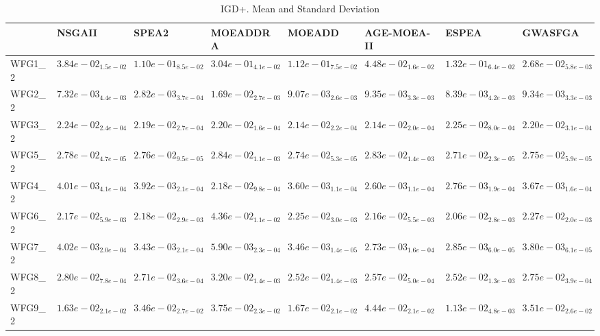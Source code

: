 \documentclass{article}
\begin{document}
\begin{table}
\caption{IGD+. Mean and Standard Deviation}
\label{table: IGD+}
\centering
\begin{scriptsize}
\begin{tabular}{llllllll}
\hline & NSGAII & SPEA2 & MOEADDRA & MOEADD & AGE-MOEA-II & ESPEA &  GWASFGA\\
\hline 
WFG1\_2 & \cellcolor{gray25}$  3.84e-02_{ 1.5e-02}$ & $  1.10e-01_{ 8.5e-02}$ & $  3.04e-01_{ 4.1e-02}$ & $  1.12e-01_{ 7.5e-02}$ & $  4.48e-02_{ 1.6e-02}$ & $  1.32e-01_{ 6.4e-02}$ & \cellcolor{gray95}$  2.68e-02_{ 5.8e-03}$ \\
WFG2\_2 & \cellcolor{gray25}$  7.32e-03_{ 4.4e-03}$ & \cellcolor{gray95}$  2.82e-03_{ 3.7e-04}$ & $  1.69e-02_{ 2.7e-03}$ & $  9.07e-03_{ 2.6e-03}$ & $  9.35e-03_{ 3.3e-03}$ & $  8.39e-03_{ 4.2e-03}$ & $  9.34e-03_{ 3.3e-03}$ \\
WFG3\_2 & $  2.24e-02_{ 2.4e-04}$ & $  2.19e-02_{ 2.7e-04}$ & $  2.20e-02_{ 1.6e-04}$ & \cellcolor{gray25}$  2.14e-02_{ 2.2e-04}$ & \cellcolor{gray95}$  2.14e-02_{ 2.0e-04}$ & $  2.25e-02_{ 8.0e-04}$ & $  2.20e-02_{ 3.1e-04}$ \\
WFG5\_2 & $  2.78e-02_{ 4.7e-05}$ & $  2.76e-02_{ 9.5e-05}$ & $  2.84e-02_{ 1.1e-03}$ & \cellcolor{gray25}$  2.74e-02_{ 5.3e-05}$ & $  2.83e-02_{ 1.4e-03}$ & \cellcolor{gray95}$  2.71e-02_{ 2.3e-05}$ & $  2.75e-02_{ 5.9e-05}$ \\
WFG4\_2 & $  4.01e-03_{ 4.1e-04}$ & $  3.92e-03_{ 2.1e-04}$ & $  2.18e-02_{ 9.8e-04}$ & $  3.60e-03_{ 1.1e-04}$ & \cellcolor{gray95}$  2.60e-03_{ 1.1e-04}$ & \cellcolor{gray25}$  2.76e-03_{ 1.9e-04}$ & $  3.67e-03_{ 1.6e-04}$ \\
WFG6\_2 & $  2.17e-02_{ 5.9e-03}$ & $  2.18e-02_{ 2.9e-03}$ & $  4.36e-02_{ 1.1e-02}$ & $  2.25e-02_{ 3.0e-03}$ & \cellcolor{gray25}$  2.16e-02_{ 5.5e-03}$ & \cellcolor{gray95}$  2.06e-02_{ 2.8e-03}$ & $  2.27e-02_{ 2.0e-03}$ \\
WFG7\_2 & $  4.02e-03_{ 2.0e-04}$ & $  3.43e-03_{ 2.1e-04}$ & $  5.90e-03_{ 2.3e-04}$ & $  3.46e-03_{ 1.4e-05}$ & \cellcolor{gray95}$  2.73e-03_{ 1.6e-04}$ & \cellcolor{gray25}$  2.85e-03_{ 6.0e-05}$ & $  3.80e-03_{ 6.1e-05}$ \\
WFG8\_2 & $  2.80e-02_{ 7.8e-04}$ & $  2.71e-02_{ 3.6e-04}$ & $  3.20e-02_{ 1.4e-03}$ & \cellcolor{gray95}$  2.52e-02_{ 1.4e-03}$ & $  2.57e-02_{ 5.0e-04}$ & \cellcolor{gray25}$  2.52e-02_{ 1.3e-03}$ & $  2.75e-02_{ 3.9e-04}$ \\
WFG9\_2 & \cellcolor{gray25}$  1.63e-02_{ 2.1e-02}$ & $  3.46e-02_{ 2.7e-02}$ & $  3.75e-02_{ 2.3e-02}$ & $  1.67e-02_{ 2.1e-02}$ & $  4.44e-02_{ 2.1e-02}$ & \cellcolor{gray95}$  1.13e-02_{ 4.8e-03}$ & $  3.51e-02_{ 2.6e-02}$ \\

\end{tabular}
\end{scriptsize}
\end{table}
\end{document}
